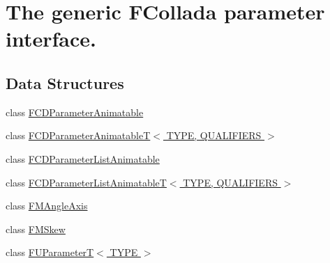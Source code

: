 \hypertarget{group__FUParameter}{
\section{The generic FCollada parameter interface.}
\label{group__FUParameter}
}
\subsection*{Data Structures}
\begin{DoxyCompactItemize}
\item 
class \hyperlink{classFCDParameterAnimatable}{FCDParameterAnimatable}
\item 
class \hyperlink{classFCDParameterAnimatableT}{FCDParameterAnimatableT$<$ TYPE, QUALIFIERS $>$}
\item 
class \hyperlink{classFCDParameterListAnimatable}{FCDParameterListAnimatable}
\item 
class \hyperlink{classFCDParameterListAnimatableT}{FCDParameterListAnimatableT$<$ TYPE, QUALIFIERS $>$}
\item 
class \hyperlink{classFMAngleAxis}{FMAngleAxis}
\item 
class \hyperlink{classFMSkew}{FMSkew}
\item 
class \hyperlink{classFUParameterT}{FUParameterT$<$ TYPE $>$}
\end{DoxyCompactItemize}
